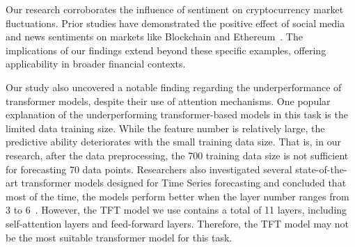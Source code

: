 \begin{table}[ht]
\centering
\caption{Correlation and Fisher z-transformed p-value for different time lags.}

\label{tab:correlation_fisher_pvalues}
\end{table}
\vspace{12pt}

Our research corroborates the influence of sentiment on cryptocurrency market fluctuations. Prior studies have demonstrated the positive effect of social media and news sentiments on markets like Blockchain and Ethereum~\cite{ranasinghe2021twitter,youssfi2023bitcoin}. The implications of our findings extend beyond these specific examples, offering applicability in broader financial contexts.

Our study also uncovered a notable finding regarding the underperformance of transformer models, despite their use of attention mechanisms. One popular explanation of the underperforming transformer-based models in this task is the limited data training size. While the feature number is relatively large, the predictive ability deteriorates with the small training data size. That is, in our research, after the data preprocessing, the 700 training data size is not sufficient for forecasting 70 data points. Researchers also investigated several state-of-the-art transformer models designed for Time Series forecasting and concluded that most of the time, the models perform better when the layer number ranges from 3 to 6~\cite{wen2022transformers}. However, the TFT model we use contains a total of 11 layers, including self-attention layers and feed-forward layers. Therefore, the TFT model may not be the most suitable transformer model for this task. 

